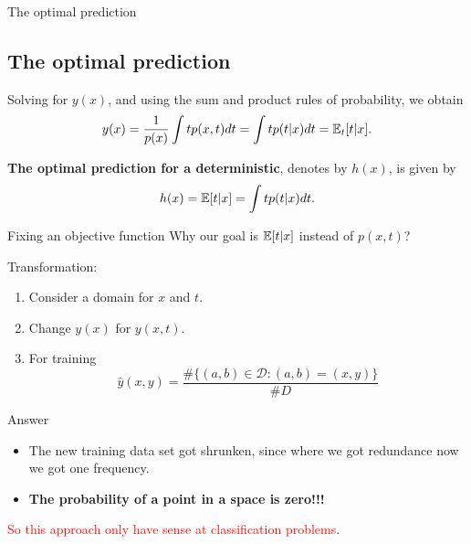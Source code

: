  \begin{frame}{The optimal prediction}
    \subsection{The optimal prediction}
    Solving for $y(x)$, and using the sum and product rules of probability, we obtain
    \begin{equation}
        y(x)
        = 
        \frac{1}{p(x)} 
        \int t p(x,t) dt
        = 
        \int t p(t|x) dt
        = \mathbb{E}_t[t|x].
    \end{equation}

    
    \textbf{The optimal prediction for a deterministic}, denotes by $h(x)$, is given by 
    \begin{equation}
      h(x) = \mathbb{E} [t|x] = \int t p(t|x) dt.
    \end{equation}
  \end{frame}

  \begin{frame}{Fixing an objective function}
  Why our goal is $\mathbb{E} [t|x]$ instead of $p(x,t)$?
   
  Transformation: 
  \begin{enumerate}
    \item Consider a domain for $x$ and $t$.
    \item Change $y(x)$ for $y(x,t)$.
    \item For training 
    \begin{equation}
        \hat y (x,y) = \frac{\#\{(a,b) \in \mathcal{D} : (a,b) = (x,y)\}}{ \#D}
    \end{equation}
  \end{enumerate}

  Answer 
  \begin{itemize}
    \item The new training data set got shrunken, 
    since where we got redundance now we got one frequency.
    \item \textbf{The probability of a point in a space is zero!!!}
  \end{itemize}
  \textcolor{red}{So this approach only have sense at classification problems}. 
  \end{frame}

